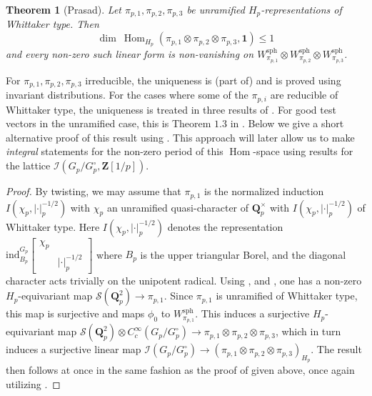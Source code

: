 \documentclass{amsart}%
\theoremstyle{plain}
\newtheorem{thm}{Theorem}[subsection]
\theoremstyle{plain}
\theoremstyle{remark}
\DeclareMathOperator{\Hom}{Hom}
\begin{document}
\begin{thm}[Prasad]\label{thm trilinear forms prasad}
Let $\pi_{p,1},\pi_{p,2},\pi_{p,3}$ be unramified $H_p$-representations of Whittaker type. Then
$$\dim\ \Hom_{H_p}(\pi_{p,1}\otimes \pi_{p,2}\otimes \pi_{p,3},\mathbf{1})\leq 1$$
and every non-zero such linear form is non-vanishing on $W_{\pi_{p,1}}^\mathrm{sph}\otimes W_{\pi_{p,2}}^\mathrm{sph}\otimes W_{\pi_{p,3}}^\mathrm{sph}$.
\end{thm}
For $\pi_{p,1},\pi_{p,2},\pi_{p,3}$ irreducible, the uniqueness is (part of) \cite[Theorem $1.1$]{prasad1990trilinear} and is proved using invariant distributions. For the cases where some of the $\pi_{p,i}$ are reducible of Whittaker type, the uniqueness is treated in three results of \cite{harris2001note}. For good test vectors in the unramified case, this is Theorem $1.3$ in \cite{prasad1990trilinear}. Below we give a short alternative proof of this result using . This approach will later allow us to make \textit{integral} statements for the non-zero period of this $\Hom$-space using results for the lattice $\mathcal{I}(G_p/G_p^\circ,\mathbf{Z}[1/p])$.
\begin{proof}
    By twisting, we may assume that $\pi_{p,1}$ is the normalized induction $I(\chi_p,|\cdot|_p^{-1/2})$ with $\chi_p$ an unramified quasi-character of $\mathbf{Q}_p^\times$ with $I(\chi_p,|\cdot|_p^{-1/2})$ of Whittaker type. Here $I(\chi_p,|\cdot|_p^{-1/2})$ denotes the representation $\mathrm{ind}_{B_p}^{G_p}\left[\begin{smallmatrix}
        \chi_p & \\
        & |\cdot|_p^{-1/2}
    \end{smallmatrix}\right]$ where $B_p$ is the upper triangular Borel, and the diagonal character acts trivially on the unipotent radical. Using \cite[Proposition $3.2.2$ \& Lemma $3.2.5$]{Loeffler_Skinner_Zerbes_2021}, and \cite[Proposition $1.5.2$]{grossi2020norm}, one has a non-zero $H_p$-equivariant map $\mathcal{S}(\mathbf{Q}_p^2)\rightarrow \pi_{p,1}$. Since $\pi_{p,1}$ is unramified of Whittaker type, this map is surjective and maps $\phi_0$ to $W_{\pi_{p,1}}^\mathrm{sph}$. This induces a surjective $H_p$-equivariant map $\mathcal{S}(\mathbf{Q}_p^2)\otimes C_c^\infty(G_p/G_p^\circ)\rightarrow \pi_{p,1}\otimes \pi_{p,2}\otimes \pi_{p,3}$, which in turn induces a surjective linear map $\mathcal{I}(G_p/G_p^\circ)\rightarrow (\pi_{p,1}\otimes \pi_{p,2}\otimes \pi_{p,3})_{H_p}$. The result then follows at once in the same fashion as the proof of  given above, once again utilizing .
\end{proof}
\end{document}
